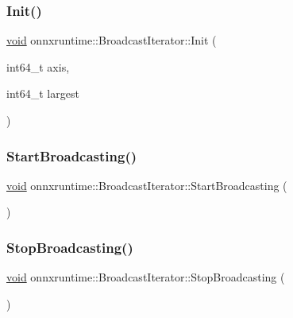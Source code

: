 \subsubsection{\texorpdfstring{Init()}{Init()}}
{\footnotesize\ttfamily \mbox{\hyperlink{mlasi_8h_a88f941d423cb2a819b70a1358982b1a6}{void}} onnxruntime\+::\+Broadcast\+Iterator\+::\+Init (\begin{DoxyParamCaption}\item[{int64\+\_\+t}]{axis,  }\item[{int64\+\_\+t}]{largest }\end{DoxyParamCaption})\hspace{0.3cm}{\ttfamily [inline]}}

\mbox{\label{structonnxruntime_1_1BroadcastIterator_a8b43e1eab529f0133283c97a12ba8d5e}} 
\subsubsection{\texorpdfstring{Start\+Broadcasting()}{StartBroadcasting()}}
{\footnotesize\ttfamily \mbox{\hyperlink{mlasi_8h_a88f941d423cb2a819b70a1358982b1a6}{void}} onnxruntime\+::\+Broadcast\+Iterator\+::\+Start\+Broadcasting (\begin{DoxyParamCaption}{ }\end{DoxyParamCaption})\hspace{0.3cm}{\ttfamily [inline]}}

\mbox{\label{structonnxruntime_1_1BroadcastIterator_a907eb4592f14f6ed2d49d5ed705e6806}} 
\subsubsection{\texorpdfstring{Stop\+Broadcasting()}{StopBroadcasting()}}
{\footnotesize\ttfamily \mbox{\hyperlink{mlasi_8h_a88f941d423cb2a819b70a1358982b1a6}{void}} onnxruntime\+::\+Broadcast\+Iterator\+::\+Stop\+Broadcasting (\begin{DoxyParamCaption}{ }\end{DoxyParamCaption})\hspace{0.3cm}{\ttfamily [inline]}}



